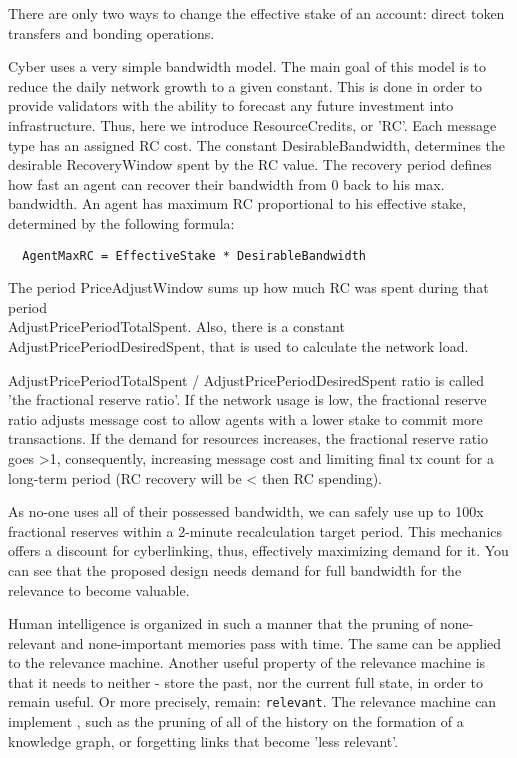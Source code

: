 \documentclass[8pt,oneside]{amsart}
\newcommand{\linkgreen}[2]{\href{#1}{\color{green}{#2}}}
\newcommand{\code}[1]{{\PlayBold #1}}
\begin{document}
\begin{Abstract}
There are only two ways to change the effective stake of an account: direct token transfers and bonding operations.

Cyber uses a very simple bandwidth model. The main goal of this model is to reduce the daily network growth to a given constant. This is done in order to provide validators with the ability to forecast any future investment into infrastructure. Thus, here we introduce \code{ResourceCredits}, or 'RC'. Each message type has an assigned RC cost. The constant \code{DesirableBandwidth}, determines the desirable \code{RecoveryWindow} spent by the RC value. The recovery period defines how fast an agent can recover their bandwidth from 0 back to his max. bandwidth. An agent has maximum RC  proportional to his effective stake, determined by the following formula:

\begin{lstlisting}
  AgentMaxRC = EffectiveStake * DesirableBandwidth
\end{lstlisting}

The period \code{PriceAdjustWindow} sums up how much RC was spent during that period\\ \code{AdjustPricePeriodTotalSpent}. Also, there is a constant \code{AdjustPricePeriodDesiredSpent}, that is used to calculate the network load.

\code{AdjustPricePeriodTotalSpent / AdjustPricePeriodDesiredSpent} ratio is called 'the fractional reserve ratio'. If the network usage is low, the fractional reserve ratio adjusts message cost to allow agents with a lower stake to commit more transactions. If the demand for resources increases, the fractional reserve ratio goes \code{>1}, consequently, increasing message cost and limiting final tx count for a long-term period (RC recovery will be \code{<} then RC spending).

As no-one uses all of their possessed bandwidth, we can safely use up to 100x fractional reserves within a 2-minute recalculation target period. This mechanics offers a discount for cyberlinking, thus, effectively maximizing demand for it. You can see that the proposed design needs demand for full bandwidth for the relevance to become valuable.

Human intelligence is organized in such a manner that the pruning of none-relevant and none-important memories pass with time. The same can be applied to the relevance machine. Another useful property of the relevance machine is that it needs to neither - store the past, nor the current full state, in order to remain useful. Or more precisely, remain: \verb|relevant|. The relevance machine can implement \linkgreen{https://ipfs.io/ipfs/QmP81EcuNDZHQutvdcDjbQEqiTYUzU315aYaTyrVj6gtJb}{aggressive pruning strategies}, such as the pruning of all of the history on the formation of a knowledge graph, or forgetting links that become 'less relevant'.


\end{Abstract}
\end{document}
